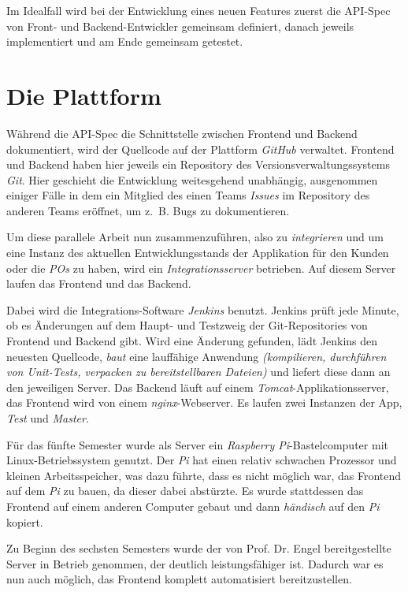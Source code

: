 \documentclass[a4paper, 11pt]{article}
\begin{document}
Im Idealfall wird bei der Entwicklung eines neuen Features zuerst die API-Spec
von Front- und Backend-Entwickler gemeinsam definiert, danach jeweils
implementiert und am Ende gemeinsam getestet.

\section{Die Plattform}

Während die API-Spec die Schnittstelle zwischen Frontend und Backend
dokumentiert, wird der Quellcode auf der Plattform \emph{GitHub} verwaltet.
Frontend und Backend haben hier jeweils ein Repository des
Versionsverwaltungssystems \emph{Git}. Hier geschieht die Entwicklung
weitesgehend unabhängig, ausgenommen einiger Fälle in dem ein Mitglied des
einen Teams \emph{Issues} im Repository des anderen Teams eröffnet, um z.~B.
Bugs zu dokumentieren.

Um diese parallele Arbeit nun zusammenzuführen, also zu \emph{integrieren} und
um eine Instanz des aktuellen Entwicklungsstands der Applikation für den Kunden
oder die \emph{POs} zu haben, wird ein \emph{Integrationsserver} betrieben.
Auf diesem Server laufen das Frontend und das Backend.

Dabei wird die Integrations-Software \emph{Jenkins} benutzt. Jenkins prüft jede
Minute, ob es Änderungen auf dem Haupt- und Testzweig der Git-Repositories von
Frontend und Backend gibt. Wird eine Änderung gefunden, lädt Jenkins den
neuesten Quellcode, \emph{baut} eine lauffähige Anwendung \emph{(kompilieren,
durchführen von Unit-Tests, verpacken zu bereitstellbaren Dateien)} und liefert
diese dann an den jeweiligen Server. Das Backend läuft auf einem
\emph{Tomcat}-Applikationsserver, das Frontend wird von einem
\emph{nginx}-Webserver. Es laufen zwei Instanzen der App, \emph{Test} und \emph{Master}.

Für das fünfte Semester wurde als Server ein \emph{Raspberry Pi}-Bastelcomputer
mit Linux-Betriebssystem genutzt. Der \emph{Pi} hat einen relativ schwachen
Prozessor und kleinen Arbeitsspeicher, was dazu führte, dass es nicht möglich
war, das Frontend auf dem \emph{Pi} zu bauen, da dieser dabei abstürzte. Es
wurde stattdessen das Frontend auf einem anderen Computer gebaut und dann
\emph{händisch} auf den \emph{Pi} kopiert.

Zu Beginn des sechsten Semesters wurde der von Prof. Dr. Engel bereitgestellte
Server in Betrieb genommen, der deutlich leistungsfähiger ist. Dadurch war es
nun auch möglich, das Frontend komplett automatisiert bereitzustellen. 
\end{document}
